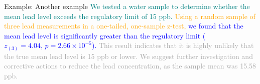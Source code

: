 \documentclass[
  ignorenonframetext,
]{beamer}
\begin{document}
\begin{frame}{Example: Another example}
\label{example-another-example-4}
\textcolor{teal}{We tested a water sample to determine whether the mean lead level exceeds the regulatory limit of 15 ppb.}
\textcolor{orange}{Using a random sample of three lead measurements in a one-tailed, one-sample z-test,}
\textcolor{blue}{we found that the mean lead level is significantly greater than the regulatory limit (\( z_{(3)}=4.04, \,p=2.66 \times 10^{-5} \)).}
\textcolor{darkgray}{This result indicates that it is highly unlikely that the true mean lead level is 15 ppb or lower. We suggest further investigation and corrective actions to reduce the lead concentration, as the sample mean was 15.58 ppb.}
\end{frame}
\end{document}

